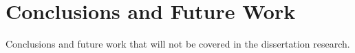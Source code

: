 \section{Conclusions and Future Work}
Conclusions and future work that will not be covered in the
dissertation research.